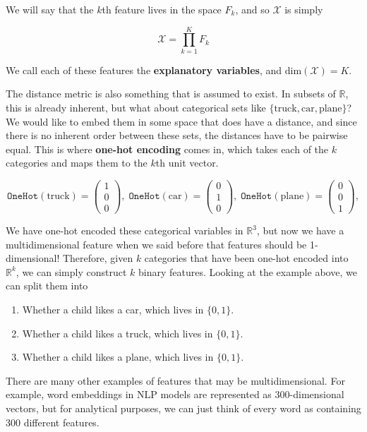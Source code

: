 \documentclass{article}
\theoremstyle{definition}
\begin{document}
  We will say that the $k$th feature lives in the space $F_k$, and so $\mathcal{X}$ is simply 

    \[\mathcal{X} = \prod_{k=1}^K  F_k\]

  We call each of these features the \textbf{explanatory variables}, and $\mathrm{dim}(\mathcal{X}) = K$. 

  The distance metric is also something that is assumed to exist. In subsets of $\mathbb{R}$, this is already inherent, but what about categorical sets like $\{\text{truck}, \text{car}, \text{plane}\}$? We would like to embed them in some space that does have a distance, and since there is no inherent order between these sets, the distances have to be pairwise equal. This is where \textbf{one-hot encoding} comes in, which takes each of the $k$ categories and maps them to the $k$th unit vector. 

    \[\texttt{OneHot}(\text{truck}) = \begin{pmatrix} 1 \\ 0 \\ 0 \end{pmatrix}, \; \texttt{OneHot}(\text{car}) = \begin{pmatrix} 0 \\ 1 \\ 0 \end{pmatrix}, \; \texttt{OneHot}(\text{plane}) = \begin{pmatrix} 0 \\ 0 \\ 1 \end{pmatrix}, \]

  We have one-hot encoded these categorical variables in $\mathbb{R}^3$, but now we have a multidimensional feature when we said before that features should be 1-dimensional! Therefore, given $k$ categories that have been one-hot encoded into $\mathbb{R}^k$, we can simply construct $k$ binary features. Looking at the example above, we can split them into 

  \begin{enumerate}
    \item Whether a child likes a car, which lives in $\{0, 1\}$. 
    \item Whether a child likes a truck, which lives in $\{0, 1\}$. 
    \item Whether a child likes a plane, which lives in $\{0, 1\}$. 
  \end{enumerate}

  There are many other examples of features that may be multidimensional. For example, word embeddings in NLP models are represented as 300-dimensional vectors, but for analytical purposes, we can just think of every word as containing 300 different features. 
\end{document}
